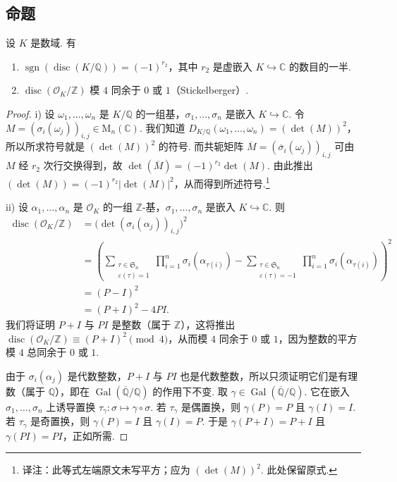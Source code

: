 \subsection{命题}\label{sec:nt-2-5-3}
\begin{proposition*}
设 $K$ 是数域. 有
\begin{enumerate}[label=\roman*)]
\item $\operatorname{sgn}(\operatorname{disc}(K/\mathbb Q))=(-1)^{r_2}$，其中 $r_2$ 是虚嵌入 $K\hookrightarrow\mathbb C$ 的数目的一半.
\item $\operatorname{disc}(\mathcal O_K/\mathbb Z)$ 模 $4$ 同余于 $0$ 或 $1$（Stickelberger）.
\end{enumerate}
\end{proposition*}
\begin{proof}
i) 设 $\omega_1,\ldots,\omega_n$ 是 $K/\mathbb Q$ 的一组基，$\sigma_1,\ldots,\sigma_n$ 是嵌入 $K\hookrightarrow\mathbb C$.
令 $M=(\sigma_i(\omega_j))_{i,j}\in\mathrm M_n(\mathbb C)$.
我们知道 $D_{K/\mathbb Q}(\omega_1,\ldots,\omega_n)=(\det(M))^2$，所以所求符号就是 $(\det(M))^2$ 的符号.
而共轭矩阵 $\overline M=(\overline\sigma_i(\omega_j))_{i,j}$ 可由 $M$ 经 $r_2$ 次行交换得到，故
$\det(\overline M)=(-1)^{r_2}\det(M)$.
由此推出 $(\det(M))=(-1)^{r_2}|\det(M)|^2$，从而得到所述符号.\footnote{译注：此等式左端原文未写平方；应为 $(\det(M))^2$. 此处保留原式.}

ii) 设 $\alpha_1,\ldots,\alpha_n$ 是 $\mathcal O_K$ 的一组 $\mathbb Z$-基，$\sigma_1,\ldots,\sigma_n$ 是嵌入 $K\hookrightarrow\mathbb C$. 则
\begin{align*}
\operatorname{disc}(\mathcal O_K/\mathbb Z)
&=\bigl(\det(\sigma_i(\alpha_j))_{i,j}\bigr)^2\\
&=\left(
\sum_{\substack{\tau\in\mathfrak S_n\\\varepsilon(\tau)=1}}
\prod_{i=1}^n\sigma_i(\alpha_{\tau(i)})
-
\sum_{\substack{\tau\in\mathfrak S_n\\\varepsilon(\tau)=-1}}
\prod_{i=1}^n\sigma_i(\alpha_{\tau(i)})
\right)^2\\
&=(P-I)^2\\
&=(P+I)^2-4PI.
\end{align*}
我们将证明 $P+I$ 与 $PI$ 是整数（属于 $\mathbb Z$），这将推出
$\operatorname{disc}(\mathcal O_K/\mathbb Z)\equiv(P+I)^2\pmod4$，从而模 $4$ 同余于 $0$ 或 $1$，因为整数的平方模 $4$ 总同余于 $0$ 或 $1$.

由于 $\sigma_i(\alpha_j)$ 是代数整数，$P+I$ 与 $PI$ 也是代数整数，所以只须证明它们是有理数（属于 $\mathbb Q$），即在 $\operatorname{Gal}(\overline{\mathbb Q}/\mathbb Q)$ 的作用下不变.
取 $\gamma\in\operatorname{Gal}(\overline{\mathbb Q}/\mathbb Q)$.
它在嵌入 $\sigma_1,\ldots,\sigma_n$ 上诱导置换 $\tau_\gamma\colon\sigma\mapsto\gamma\circ\sigma$.
若 $\tau_\gamma$ 是偶置换，则 $\gamma(P)=P$ 且 $\gamma(I)=I$.
若 $\tau_\gamma$ 是奇置换，则 $\gamma(P)=I$ 且 $\gamma(I)=P$.
于是 $\gamma(P+I)=P+I$ 且 $\gamma(PI)=PI$，正如所需.
\end{proof}

